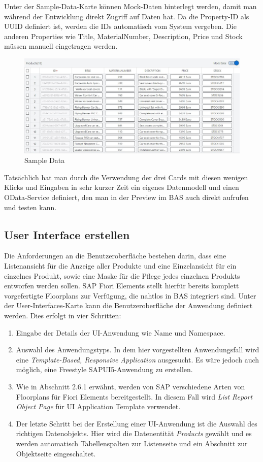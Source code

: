 Unter der Sample-Data-Karte können Mock-Daten hinterlegt werden, damit man während der Entwicklung direkt Zugriff auf Daten hat. Da die Property-ID als UUID definiert ist, werden die IDs automatisch vom System vergeben. Die anderen Properties wie Title, MaterialNumber, Description, Price und Stock müssen manuell eingetragen werden.

\begin{figure}[htbp]
 \centering
 \includegraphics[width=1.0\textwidth]{Bilder/fiori_element/3_6_Sample_Data.JPG}
 \caption{Sample Data}
\end{figure}

Tatsächlich hat man durch die Verwendung der drei Cards mit diesen wenigen Klicks und Eingaben in sehr kurzer Zeit ein eigenes Datenmodell und einen OData-Service definiert, den man in der Preview im BAS auch direkt aufrufen und testen kann.

\subsection{User Interface erstellen }

Die Anforderungen an die Benutzeroberfläche bestehen darin, dass eine Listenansicht für die Anzeige aller Produkte und eine Einzelansicht für ein einzelnes Produkt, sowie eine Maske für die Pflege jedes einzelnen Produkts entworfen werden sollen. SAP Fiori Elements stellt hierfür bereits komplett vorgefertigte Floorplans zur Verfügung, die nahtlos in BAS integriert sind.
Unter der User-Interfaces-Karte kann die Benutzeroberfläche der Anwendung definiert werden. Dies erfolgt in vier Schritten: 

\begin{enumerate}
\item Eingabe der Details der UI-Anwendung wie Name und Namespace.
\item Auswahl des Anwendungstyps. In dem hier vorgestellten Anwendungsfall wird eine \textit{Template-Based, Responsive Application} ausgesucht. Es wäre jedoch auch möglich, eine Freestyle SAPUI5-Anwendung zu erstellen.
\item Wie in Abschnitt 2.6.1 erwähnt, werden von SAP verschiedene Arten von Floorplans für Fiori Elements bereitgestellt. In diesem Fall wird \textit{List Report Object Page} für UI Application Template verwendet.
\item Der letzte Schritt bei der Erstellung einer UI-Anwendung ist die Auswahl des richtigen Datenobjekts. Hier wird die Datenentität \textit{Products} gewählt und es werden automatisch Tabellenspalten zur Listenseite und ein Abschnitt zur Objektseite eingeschaltet. 
\end{enumerate}

